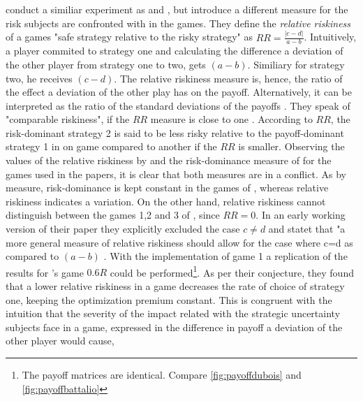 \documentclass[11pt]{article}
\begin{document}
\textcite{dubois_optimization_2012} conduct a similiar experiment as 
\textcite{schmidt_playing_2003} and \textcite{battalio_optimization_2001},
but introduce a different measure for the risk subjects are confronted with in
the games. They define the \textit{relative riskiness} of a games 
"safe strategy relative to the risky strategy" as $RR = \frac{|c-d|}{a-b}$.
Intuitively, a player commited to strategy one and calculating the 
difference a deviation of the other player from strategy one to two, gets
$(a-b)$. Similiary for strategy two, he receives $(c-d)$. The relative riskiness
measure is, hence, the ratio of the effect a deviation of the other play has 
on the payoff. Alternatively, it can be interpreted as the ratio of the 
standard deviations of the payoffs \parencite{dubois_optimization_2012}. 
They speak of "comparable riskiness", if the $RR$ measure is close to one 
\parencite{dubois_optimization_2012}. According to $RR$, the risk-dominant 
strategy 2 is said to be less risky relative to the payoff-dominant strategy 
1 in on game compared to another if the $RR$ is smaller.
Observing the values of the relative riskiness by 
\textcite{dubois_optimization_2012} and the risk-dominance measure of 
\textcite{schmidt_playing_2003} for the games used in the papers, it is clear
that both measures are in a conflict. As by \textcite{schmidt_playing_2003}
measure, risk-dominance is kept constant in the games of 
\textcite{battalio_optimization_2001}, whereas relative riskiness indicates a 
variation. On the other hand, relative riskiness cannot distinguish between
the games 1,2 and 3 of \textcite{schmidt_playing_2003}, since $RR=0$. In an
early working version of their paper they explicitly excluded the case 
$c \neq d$ and statet that "a more general measure of relative riskiness 
should allow for the case where c=d as compared to $(a-b)$ 
\parencite{dubois_optimization_2008_working}. 
With the implementation of game 1 a replication of the results for 
\textcite{battalio_optimization_2001}'s game $0.6R$ could be 
performed\footnote{The payoff matrices are identical. 
Compare \ref{fig:payoffdubois} and \ref{fig:payoffbattalio}}. 
As per their conjecture, they found that a lower relative riskiness in a game 
decreases the rate of choice of strategy one, keeping the optimization premium 
constant. This is congruent with the intuition that the severity of the impact 
related with the strategic uncertainty subjects face in a game, expressed in
the difference in payoff a deviation of the other player would cause,
\end{document}
